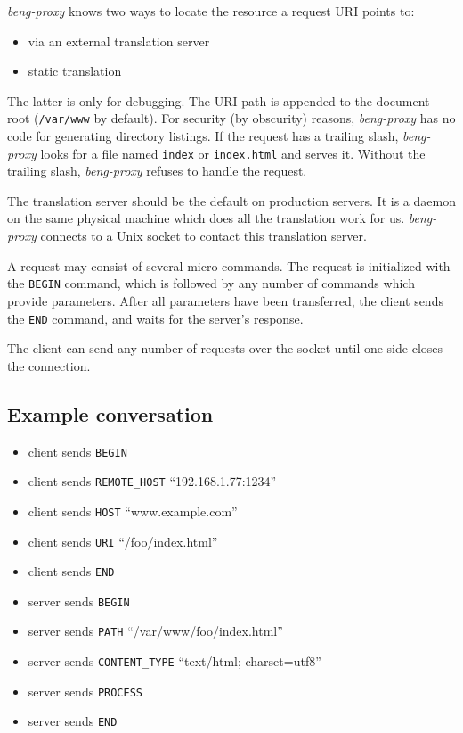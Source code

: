 \documentclass[a4paper,12pt]{article}
\begin{document}
\emph{beng-proxy} knows two ways to locate the resource a request URI
points to:

\begin{itemize}
\item via an external translation server
\item static translation
\end{itemize}

The latter is only for debugging.  The URI path is appended to the
document root (\texttt{/var/www} by default).  For security (by
obscurity) reasons, \emph{beng-proxy} has no code for generating
directory listings.  If the request has a trailing slash,
\emph{beng-proxy} looks for a file named \texttt{index} or
\texttt{index.html} and serves it.  Without the trailing slash,
\emph{beng-proxy} refuses to handle the request.

The translation server should be the default on production servers.
It is a daemon on the same physical machine which does all the
translation work for us.  \emph{beng-proxy} connects to a Unix socket
to contact this translation server.

A request may consist of several micro commands.  The request is
initialized with the \texttt{BEGIN} command, which is followed by any
number of commands which provide parameters.  After all parameters
have been transferred, the client sends the \texttt{END} command,
and waits for the server's response.

The client can send any number of requests over the socket until one
side closes the connection.

\subsection{Example conversation}

\begin{itemize}
\item client sends \verb|BEGIN|
\item client sends \verb|REMOTE_HOST| ``192.168.1.77:1234''
\item client sends \verb|HOST| ``www.example.com''
\item client sends \verb|URI| ``/foo/index.html''
\item client sends \verb|END|
\item server sends \verb|BEGIN|
\item server sends \verb|PATH| ``/var/www/foo/index.html''
\item server sends \verb|CONTENT_TYPE| ``text/html; charset=utf8''
\item server sends \verb|PROCESS|
\item server sends \verb|END|
\end{itemize}
\end{document}
